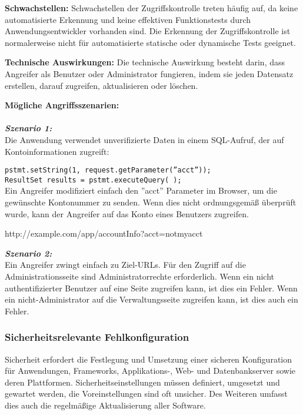 \textbf{Schwachstellen:} Schwachstellen der Zugriffskontrolle treten häufig auf, da keine automatisierte Erkennung und keine effektiven Funktionstests durch Anwendungsentwickler vorhanden sind. Die Erkennung der Zugriffskontrolle ist normalerweise nicht für automatisierte statische oder dynamische Tests geeignet\cite[11]{owasp17top10}.

\textbf{Technische Auswirkungen:} Die technische Auswirkung besteht darin, dass Angreifer als Benutzer oder Administrator fungieren, indem sie jeden Datensatz erstellen, darauf zugreifen, aktualisieren oder löschen\cite[11]{owasp17top10}.
 
\textbf{Mögliche Angriffsszenarien:}\\
\\
\textbf{\textit{Szenario 1:}}\\
Die Anwendung verwendet unverifizierte Daten in einem SQL-Aufruf, der auf Kontoinformationen zugreift\cite[11]{owasp17top10}:

\texttt{pstmt.setString(1, request.getParameter(''acct''));\\
	ResultSet results = pstmt.executeQuery( );}\\
Ein Angreifer modifiziert einfach den ''acct'' Parameter im Browser, um die gewünschte Kontonummer zu senden. Wenn dies nicht ordnungsgemäß überprüft wurde, kann der Angreifer auf das Konto eines Benutzers zugreifen.

http://example.com/app/accountInfo?acct=notmyacct

\textbf{\textit{Szenario 2:}}\\
Ein Angreifer zwingt einfach zu Ziel-URLs. Für den Zugriff auf die Administrationsseite sind Administratorrechte erforderlich. Wenn ein nicht authentifizierter Benutzer auf eine Seite zugreifen kann, ist dies ein Fehler. Wenn ein nicht-Administrator auf die Verwaltungsseite zugreifen kann, ist dies auch ein Fehler\cite[11]{owasp17top10}.

\subsubsection{Sicherheitsrelevante Fehlkonfiguration}

Sicherheit erfordert die Festlegung und Umsetzung einer sicheren Konfiguration für Anwendungen, Frameworks, Applikations-, Web- und Datenbankserver sowie deren Plattformen. Sicherheitseinstellungen müssen definiert, umgesetzt und gewartet werden, die Voreinstellungen sind oft unsicher. Des Weiteren umfasst dies auch die regelmäßige Aktualisierung aller Software\cite[6]{owasp17top10}.

